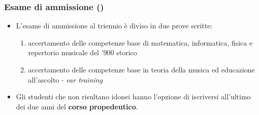 %
%
%

\setcounter{ms}{0}
\begin{frame}
    \frametitle<+->{Esame di ammissione ()}

	\begin{itemize}[<+- | alert@+->]

		\item L'esame di ammissione al triennio è diviso in due prove scritte:

      \begin{enumerate}[<+- | alert@+->]

        \item accertamento delle competenze base di matematica, informatica,
	fisica e repertorio musicale del '900 storico


        \item accertamento delle competenze base in teoria della musica ed
        educazione all'ascolto - \emph{ear training}

     \end{enumerate}

    \item Gli studenti che non risultano idonei hanno l'opzione di iscriversi 
    all'ultimo dei due anni del \textbf{corso propedeutico}.

	\end{itemize}

\end{frame}
